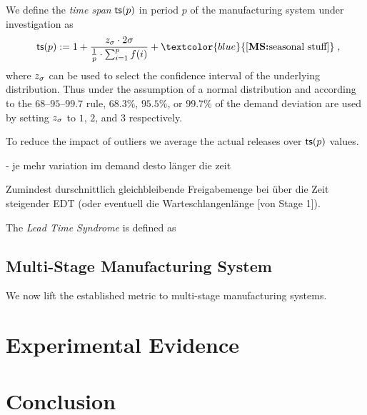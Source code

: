 \documentclass[mnsc]{informs3}
\DeclarePairedDelimiter{\ceil}{\lceil}{\rceil}
\newcommand\MS[2][r]{\ifx t#1 \textcolor{blue}{[\textbf{MS:} #2]}
  \else \begin{center}\textcolor{blue}{\textbf{MS:} #2} \end{center} \fi}
\begin{document}
\begin{definition}
  We define the \emph{time span} $\mathsf{ts}(p)$ in period $p$ of the manufacturing system
  under investigation as
  \begin{align*}
    \ts{p} \defsym 1 + %
    \frac{ \zs \cdot 2 \sigma}{\frac{1}{p} \cdot \sum_{i=1}^{p}{f(i)}}
    +
    \MS[t]{\text{seasonal stuff}} \tcom
  \end{align*}
  where $z_{\sigma}$ can be used to select the confidence interval of the underlying distribution. Thus
  under the assumption of a normal distribution and according to the $68$--$95$--$99.7$ rule,
  $68.3\%$, $95.5\%$, or $99.7\%$ of the demand deviation are used by setting $z_{\sigma}$ to $1$, $2$, and
  $3$ respectively.
\end{definition}


To reduce the impact of outliers we average the actual releases over $\mathsf{ts}(p)$ values.


- je mehr variation im demand desto länger die zeit


Zumindest durschnittlich gleichbleibende Freigabemenge bei über die Zeit steigender EDT (oder
eventuell die Warteschlangenlänge [von Stage 1]).


\begin{definition}
  The \emph{Lead Time Syndrome} is defined as
\end{definition}



\subsection{Multi-Stage Manufacturing System}
\label{subsec:Multi-Stage_Manufacturing_System}


We now lift the established metric to multi-stage manufacturing systems.


\section{Experimental Evidence}
\label{sec:Experimental_Evidence}


\section{Conclusion}
\label{sec:Conclusion}




\end{document}
